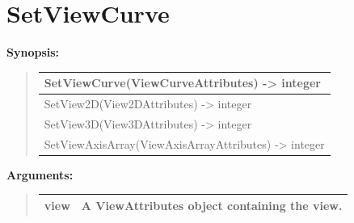\documentclass[letterpaper,10pt,english]{sphinxmanual}
\begin{document}
\begin{DUlineblock}{0em}
\item[] 
\end{DUlineblock}


\section{SetViewCurve}
\label{functions:setviewcurve}
\begin{DUlineblock}{0em}
\item[] \textbf{Synopsis:}
\end{DUlineblock}
\begin{quote}

\begin{tabulary}{\linewidth}{|L|}
\hline

SetViewCurve(ViewCurveAttributes) -\textgreater{} integer
\\
\hline
SetView2D(View2DAttributes) -\textgreater{} integer
\\
\hline
SetView3D(View3DAttributes) -\textgreater{} integer
\\
\hline
SetViewAxisArray(ViewAxisArrayAttributes) -\textgreater{} integer
\\
\hline\end{tabulary}

\end{quote}

\begin{DUlineblock}{0em}
\item[] 
\item[] \textbf{Arguments:}
\end{DUlineblock}
\begin{quote}

\begin{tabulary}{\linewidth}{|L|L|}
\hline

view
 & 
A ViewAttributes object containing the view.
\\
\hline\end{tabulary}

\end{quote}
\end{document}
